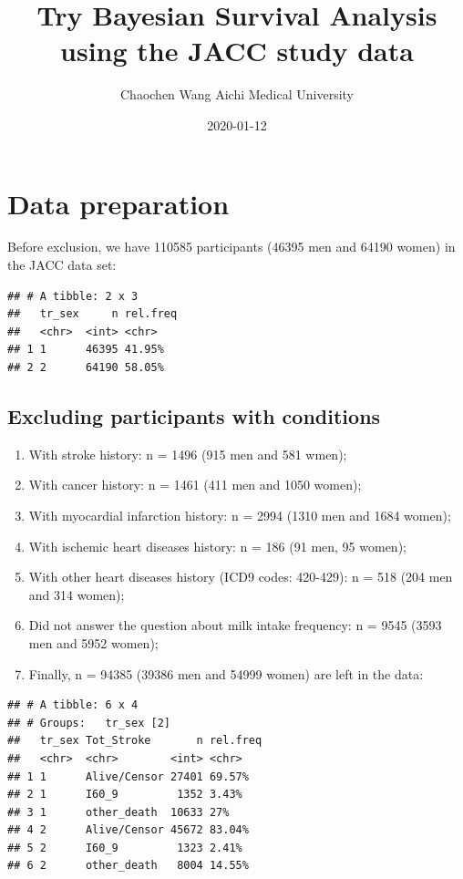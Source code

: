 \documentclass[]{tufte-handout}
\title{Try Bayesian Survival Analysis using the JACC study data}
\author{Chaochen Wang \textbar{} Aichi Medical University}
\date{2020-01-12}
\providecommand{\tightlist}{%
  \setlength{\itemsep}{0pt}\setlength{\parskip}{0pt}}
\begin{document}
\maketitle




\hypertarget{data-preparation}{%
\section{Data preparation}\label{data-preparation}}

Before exclusion, we have 110585 participants (46395 men and 64190
women) in the JACC data set:

\begin{verbatim}
## # A tibble: 2 x 3
##   tr_sex     n rel.freq
##   <chr>  <int> <chr>   
## 1 1      46395 41.95%  
## 2 2      64190 58.05%
\end{verbatim}

\hypertarget{excluding-participants-with-conditions}{%
\subsection{Excluding participants with
conditions}\label{excluding-participants-with-conditions}}

\begin{enumerate}
\def\labelenumi{\arabic{enumi}.}
\tightlist
\item
  With stroke history: n = 1496 (915 men and 581 wmen);
\item
  With cancer history: n = 1461 (411 men and 1050 women);
\item
  With myocardial infarction history: n = 2994 (1310 men and 1684
  women);
\item
  With ischemic heart diseases history: n = 186 (91 men, 95 women);
\item
  With other heart diseases history (ICD9 codes: 420-429): n = 518 (204
  men and 314 women);
\item
  Did not answer the question about milk intake frequency: n = 9545
  (3593 men and 5952 women);
\item
  Finally, n = 94385 (39386 men and 54999 women) are left in the data:
\end{enumerate}

\begin{verbatim}
## # A tibble: 6 x 4
## # Groups:   tr_sex [2]
##   tr_sex Tot_Stroke       n rel.freq
##   <chr>  <chr>        <int> <chr>   
## 1 1      Alive/Censor 27401 69.57%  
## 2 1      I60_9         1352 3.43%   
## 3 1      other_death  10633 27%     
## 4 2      Alive/Censor 45672 83.04%  
## 5 2      I60_9         1323 2.41%   
## 6 2      other_death   8004 14.55%
\end{verbatim}
\end{document}
